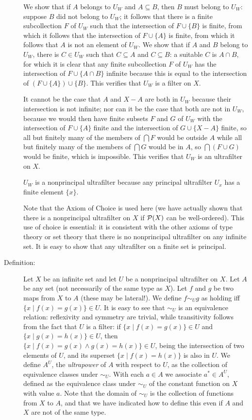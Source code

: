\documentclass[12pt]{book}
\begin{document}
\begin{description}
We show that if $A$ belongs to $U_W$ and $A \subseteq B$, then $B$ must belong to $U_W$:  suppose
$B$ did not belong to $U_W$; it follows that there is a finite subcollection $F$ of $U_W$ such that the intersection of $F \cup \{B\}$ is finite,
from which it follows that the intersection of $F \cup \{A\}$ is finite, from which it follows that $A$ is not an element of $U_W$.  We show that
if $A$ and $B$ belong to $U_W$, there is $C \in U_W$ such that $C \subseteq A$ and $C \subseteq B$:  a suitable $C$ is $A \cap B$, for which it is clear 
that any finite subcollection $F$ of $U_W$ has the intersection of $F \cup \{A \cap B\}$ infinite because this is equal to the intersection of
$(F \cup \{A\}) \cup \{B\}$.  This verifies that $U_W$ is a filter on $X$.

It cannot be the case that $A$ and $X-A$ are both in $U_W$ because their intersection is not infinite;
nor can it be the case that both are not in $U_W$, because we would then have finite subsets $F$ and $G$ of $U_W$ with the intersection
of $F \cup \{A\}$ finite and the intersection of $G \cup \{X-A\}$ finite, so all but finitely many of the members of $\bigcap F$ would be outside
$A$ while all but finitely many of the members of $\bigcap G$ would be in $A$, so $\bigcap(F \cup G)$ would be finite, which is impossible.  This verifies that $U_W$ is an ultrafilter on $X$.

$U_W$ is a nonprincipal ultrafilter because any principal ultrafilter $U_x$ has a finite element $\{x\}$.

Note that the Axiom of Choice is used here (we have actually shown that there is a nonprincipal ultrafilter on $X$ if ${\cal P}(X)$ can be well-ordered).
This use of choice is essential:  it is consistent with the other axioms of type theory or set theory that there is no nonprincipal ultrafilter on any infinite set.
It is easy to show that any ultrafilter on a finite set is principal.

\item[Definition:]  Let $X$ be an infinite set and let $U$ be a nonprincipal ultrafilter on $X$.  Let $A$ be any set (not necessarily of the same type as $X$).
Let $f$ and $g$ be two maps from $X$ to $A$ (these may be lateral!).  We define $f \sim_U g$ as holding iff $\{x \mid f(x)=g(x)\} \in U$.
It is easy to see that $\sim_U$ is an equivalence relation:  reflexivity and symmetry are trivial, while transitivity follows from the fact that
$U$ is a filter:  if $\{x \mid f(x)=g(x)\}\in U$ and $\{x \mid g(x)=h(x)\} \in U$, then $\{x \mid f(x) = g(x) \wedge g(x) = h(x)\} \in U$, being the intersection of two elements of $U$, and its superset $\{x \mid f(x)=h(x)\}$ is also in $U$.
We define $A^U$, the {\em ultrapower\/} of $A$ with respect to $U$, as the collection of equivalence classes under $\sim_U$.   With each $a \in A$ we associate $a^* \in A^U$, defined as the equivalence class under $\sim_U$ of the constant function on $X$ with value $a$.  Note that the domain of $\sim_U$ is the collection of functions from $X$ to $A$, and that we have indicated how to define this even if $A$ and $X$ are not of the same type.


\end{description}
\end{document}
